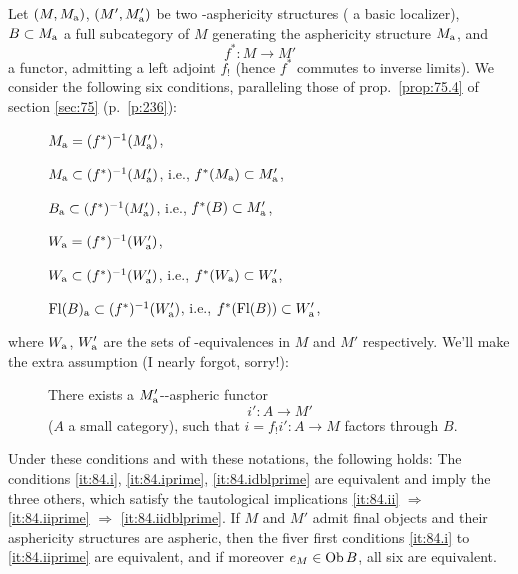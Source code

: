 \begin{proposition}
  Let $(M,M_{\mathrm{a}})$, $(M',M'_{\mathrm{a}})$ be two
  \scrW-asphericity structures \textup(\scrW{} a basic
  localizer\textup), $B\subset M_{\mathrm{a}}$ a full subcategory of $M$
  generating the asphericity structure $M_{\mathrm{a}}$, and
  \[f^*:M\to M'\]
  a functor, admitting a left adjoint $f_!$ \textup(hence $f^*$
  commutes to inverse limits\textup). We consider the following six
  conditions, paralleling those of prop.\ \ref{prop:75.4} of section
  \ref{sec:75} \textup(p.\ \ref{p:236}\textup):
  \begin{description}
  \item[]
    $M_{\mathrm{a}} = (f^*)^{-1}(M'_{\mathrm{a}})$,
  \item[]
    $M_{\mathrm{a}} \subset (f^*)^{-1}(M'_{\mathrm{a}})$, i.e., $f^*(M_{\mathrm{a}}) \subset M'_{\mathrm{a}}$,
  \item[]
    $B_{\mathrm{a}} \subset (f^*)^{-1}(M'_{\mathrm{a}})$, i.e., $f^*(B) \subset M'_{\mathrm{a}}$,
  \item[]
    $W_{\mathrm{a}} = (f^*)^{-1}(W'_{\mathrm{a}})$,
  \item[] 
    $W_{\mathrm{a}} \subset (f^*)^{-1}(W'_{\mathrm{a}})$, i.e., $f^*(W_{\mathrm{a}})\subset W'_{\mathrm{a}}$,
  \item[] 
    $\operatorname{Fl}(B)_{\mathrm{a}} \subset (f^*)^{-1}(W'_{\mathrm{a}})$, i.e., $f^*(\operatorname{Fl}(B))\subset W'_{\mathrm{a}}$,
  \end{description}
  where $W_{\mathrm{a}}$, $W'_{\mathrm{a}}$ are the sets of \scrW-equivalences in $M$
  and $M'$ respectively. We'll make the extra assumption \textup(I
  nearly forgot, sorry!\textup):
  \begin{description}
  \item[]
    There exists a $M'_{\mathrm{a}}$-\scrW-aspheric functor
    \[i':A\to M'\]
    \textup($A$ a small category\textup), such that $i=f_!i':A\to M$
    factors through $B$.
  \end{description}
  Under these conditions and with these notations, the following
  holds: The conditions \textup{\ref{it:84.i}, \ref{it:84.iprime},
    \ref{it:84.idblprime}} are equivalent and imply the three others,
  which satisfy the tautological implications \textup{\ref{it:84.ii}}
  $\Rightarrow$ \textup{\ref{it:84.iiprime}} $\Rightarrow$
  \textup{\ref{it:84.iidblprime}}. If $M$ and $M'$ admit final objects
  and their asphericity structures are aspheric, then the fiver first
  conditions \textup{\ref{it:84.i}} to \textup{\ref{it:84.iiprime}}
  are equivalent, and if moreover $e_M\in \operatorname{Ob} B$, all six are
  equivalent.
\end{proposition}
